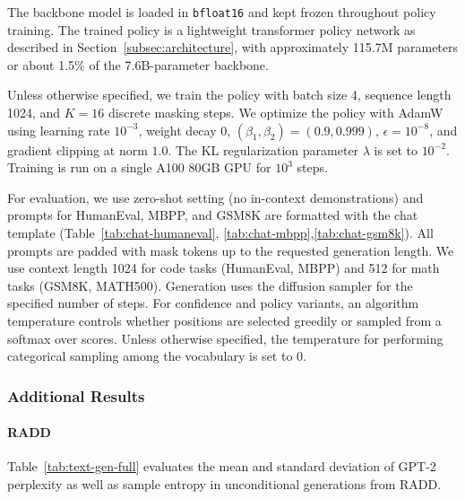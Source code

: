 The backbone model is loaded in \texttt{bfloat16} and kept frozen throughout policy training. The trained policy is a lightweight transformer policy network as described in Section~\ref{subsec:architecture}, with approximately 115.7M parameters or about 1.5\% of the 7.6B-parameter backbone.

Unless otherwise specified, we train the policy with batch size 4, sequence length 1024, and \(K=16\) discrete masking steps. We optimize the policy with AdamW using learning rate \(10^{-3}\), weight decay 0, \((\beta_1,\beta_2)=(0.9,0.999)\), \(\epsilon=10^{-8}\), and gradient clipping at norm $1.0$. The KL regularization parameter $\lambda$ is set to $10^{-2}$. Training is run on a single A100 80GB GPU for $10^3$ steps.

For evaluation, we use zero-shot setting (no in-context demonstrations) and prompts for HumanEval, MBPP, and GSM8K are formatted with the chat template (Table~\ref{tab:chat-humaneval}, \ref{tab:chat-mbpp},\ref{tab:chat-gsm8k}). All prompts are padded with mask tokens up to the requested generation length. We use context length 1024 for code tasks (HumanEval, MBPP) and 512 for math tasks (GSM8K, MATH500). Generation uses the diffusion sampler for the specified number of steps. For confidence and policy variants, an algorithm temperature controls whether positions are selected greedily or sampled from a softmax over scores. Unless otherwise specified, the temperature for performing categorical sampling among the vocabulary is set to $0$.



\subsubsection{Additional Results}\label{sec:vlp-additional-results}

\paragraph{RADD} Table~\ref{tab:text-gen-full} evaluates the mean and standard deviation of GPT-2 perplexity as well as sample entropy in unconditional generations from RADD.

